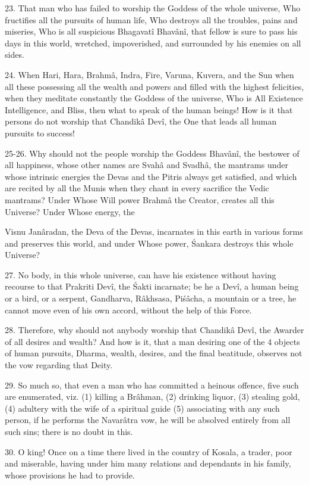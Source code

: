 23. That man who has failed to worship the Goddess of the whole universe, Who fructifies all the pursuits of human life, Who destroys all the troubles, pains and miseries, Who is all suspicious Bhagavat\^i Bhav\^an\^i, that fellow is sure to pass his days in this world, wretched, impoverished, and surrounded by his enemies on all sides.

24. When Hari, Hara, Brahm\^a, Indra, Fire, Varuna, Kuvera, and the Sun when all these possessing all the wealth and powers and filled with the highest felicities, when they meditate constantly the Goddess of the universe, Who is All Existence Intelligence, and Bliss, then what to speak of the human beings! How is it that persons do not worship that Chandik\^a Dev\^i, the One that leads all human pursuits to success!

25-26. Why should not the people worship the Goddess Bhav\^an\^i, the bestower of all happiness, whose other names are Svah\^a and Svadh\^a, the mantrams under whose intrinsic energies the Devas and the Pitris always get satisfied, and which are recited by all the Munis when they chant in every sacrifice the Vedic mantrams? Under Whose Will power Brahm\^a the Creator, creates all this Universe? Under Whose energy, the

Visnu Jan\^aradan, the Deva of the Devas, incarnates in this earth in various forms and preserves this world, and under Whose power, \'Sankara destroys this whole Universe?

27. No body, in this whole universe, can have his existence without having recourse to that Prakriti Dev\^i, the \'Sakti incarnate; be he a Dev\^i, a human being or a bird, or a serpent, Gandharva, R\^akhsasa, Pi\'s\^acha, a mountain or a tree, he cannot move even of his own accord, without the help of this Force.

28. Therefore, why should not anybody worship that Chandik\^a Dev\^i, the Awarder of all desires and wealth? And how is it, that a man desiring one of the 4 objects of human pursuits, Dharma, wealth, desires, and the final beatitude, observes not the vow regarding that Deity.

29. So much so, that even a man who has committed a heinous offence, five such are enumerated, viz. (1) killing a Br\^ahman, (2) drinking liquor, (3) stealing gold, (4) adultery with the wife of a spiritual guide (5) associating with any such person, if he performs the Navar\^atra vow, he will be absolved entirely from all such sins; there is no doubt in this.

30. O king! Once on a time there lived in the country of Kosala, a trader, poor and miserable, having under him many relations and dependants in his family, whose provisions he had to provide.

